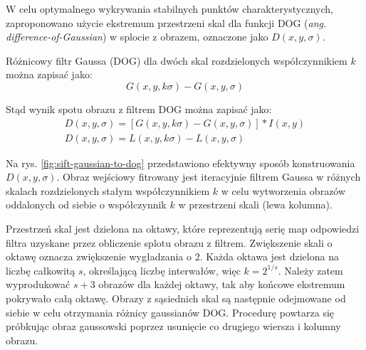 W celu optymalnego wykrywania stabilnych punktów charakterystycznych, zaproponowano użycie ekstremum przestrzeni skal dla funkcji DOG (\emph{ang. difference-of-Gaussian}) w splocie z obrazem, oznaczone jako $D(x, y, \sigma)$.

Różnicowy filtr Gaussa (DOG) dla dwóch skal rozdzielonych współczynnikiem $k$ można zapisać jako:
\begin{equation} 
\label{sift_dog} 
G(x, y, k\sigma) - G(x, y, \sigma) 
\end{equation} 

Stąd wynik spotu obrazu z filtrem DOG można zapisać jako:
\begin{equation} 
\label{sift_splot} 
	\begin{gathered}
		D(x, y, \sigma) = [G(x, y, k\sigma) - G(x, y, \sigma)] \ast I(x, y) \\
		D(x, y, \sigma) = L(x, y, k\sigma) - L(x, y, \sigma)
	\end{gathered}
\end{equation}

Na rys. \ref{fig:sift-gaussian-to-dog} przedstawiono efektywny sposób konstruowania $D(x, y, \sigma)$. Obraz wejściowy fitrowany jest iteracyjnie filtrem Gaussa w różnych skalach rozdzielonych stałym współczynnikiem $k$ w celu wytworzenia obrazów oddalonych od siebie o współczynnik $k$ w przestrzeni skali (lewa kolumna).

Przestrzeń skal jest dzielona na oktawy, które reprezentują serię map odpowiedzi filtra uzyskane przez obliczenie splotu obrazu z filtrem. Zwiększenie skali o oktawę oznacza zwiększenie wygładzania o 2. Każda oktawa jest dzielona na liczbę całkowitą $s$, określającą liczbę interwałów, więc $k=2^{1/s}$. Należy zatem wyprodukować $s+3$ obrazów dla każdej oktawy, tak aby końcowe ekstremum pokrywało całą oktawę. Obrazy z sąsiednich skal są następnie odejmowane od siebie w celu otrzymania różnicy gaussianów DOG. Procedurę powtarza się próbkując obraz gaussowski poprzez usunięcie co drugiego wiersza i kolumny obrazu.\cite{LOWE04}

